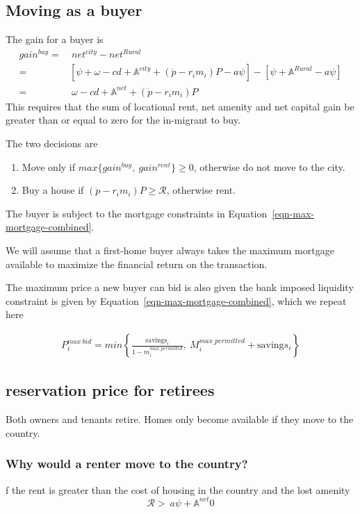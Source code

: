 {\subsection{Moving as a buyer}
The gain for a buyer is 
\begin{align}
gain^{buy}=&\ net^{city}-net^{Rural}\nonumber\\
=&\left[\psi+\omega-cd+\mathbb{A}^{city}+(\dot p-r_im_i)P-a\psi\right]-\left[\psi+\mathbb{A}^{Rural}-a\psi\right] \nonumber\\
=&\ \omega-cd+\mathbb{A}^{net}+(\dot p-r_im_i)P  \label{eq-move-to-buy}
\end{align}
This requires that the sum of  locational rent, net amenity and net capital gain be greater than or equal to zero for the in-migrant to buy.

The two decisions  are 
\begin{enumerate}
    \item Move only if $max\{gain^{buy},\ gain^{rent}\} \ge 0$, otherwise do not move to the city.
    
    \item Buy a house if $(\dot p-r_im_i)P\ge  \mathcal{R}$, otherwise rent.
\end{enumerate}

The buyer is subject to the mortgage constraints in Equation~\ref{eqn-max-mortgage-combined}.

We will assume that a first-home buyer always takes the maximum mortgage available to maximize the financial return on the transaction. 

The maximum price a new buyer can bid is also given the bank imposed liquidity constraint is given by Equation~\ref{eqn-max-mortgage-combined}, which we repeat here


\begin{align}
P_i^{max\ bid}= min \left\{\frac{\mathrm{savings}_i}{1-m_i^{max\_permitted}},\  M_i^{max\_permitted} + \mathrm{saving}s_i  \right\}   \nonumber  
\end{align}


\subsection{reservation price for retirees}
Both owners and tenants retire. Homes only become available if they move to the country. 



\subsubsection{Why would a renter move to the country?} 
f the rent is greater than the cost of housing in the country and the lost amenity
\[\mathcal{R} > \ a\psi+ \mathbb{A}^{net}0\]


}
